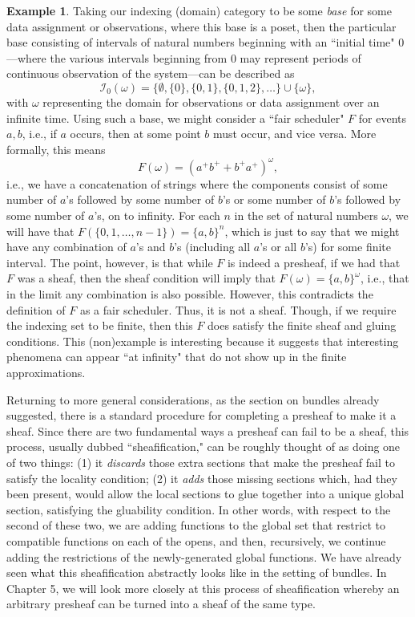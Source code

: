\documentclass[a4paper]{book}
\theoremstyle{definition}
\newtheorem{example}{Example}[section]
\theoremstyle{definition}
\theoremstyle{definition}
\theoremstyle{theorem}
\theoremstyle{definition}
\begin{document}
\begin{example}
Taking our indexing (domain) category to be some \textit{base} for some data assignment or observations, where this base is a poset, then the particular base consisting of intervals of natural numbers beginning with an ``initial time" 0---where the various intervals beginning from 0 may represent periods of continuous observation of the system---can be described as
\begin{equation*}
\mathscr{I}_0 (\omega) = \{\emptyset, \{0\}, \{0,1\}, \{0,1,2\}, \dots \} \cup \{\omega \},
\end{equation*} 
with $\omega$ representing the domain for observations or data assignment over an infinite time. Using such a base, we might consider a ``fair scheduler" $F$ for events $a,b$, i.e., if $a$ occurs, then at some point $b$ must occur, and vice versa. More formally, this means 
\begin{equation*}
F(\omega) = (a^{+}b^{+} + b^{+}a^{+})^{\omega},
\end{equation*}
 i.e., we have a concatenation of strings where the components consist of some number of $a$'s followed by some number of $b$'s or some number of $b$'s followed by some number of $a$'s, on to infinity. For each $n$ in the set of natural numbers $\omega$, we will have that $F(\{0,1,\dots,n-1 \}) = \{a, b\}^n$, which is just to say that we might have any combination of $a$'s and $b$'s (including all $a$'s or all $b$'s) for some finite interval. The point, however, is that while $F$ is indeed a presheaf, if we had that $F$ was a sheaf, then the sheaf condition will imply that $F(\omega) = \{a,b \}^{\omega}$, i.e., that in the limit any combination is also possible.  However, this contradicts the definition of $F$ as a fair scheduler. Thus, it is not a sheaf. Though, if we require the indexing set to be finite, then this $F$ does satisfy the finite sheaf and gluing conditions. This (non)example is interesting because it suggests that interesting phenomena can appear ``at infinity" that do not show up in the finite approximations. 
\end{example} 
Returning to more general considerations, as the section on bundles already suggested, there is a standard procedure for completing a presheaf to make it a sheaf. Since there are two fundamental ways a presheaf can fail to be a sheaf, this process, usually dubbed ``sheafification," can be roughly thought of as doing one of two things: (1) it \textit{discards} those extra sections that make the presheaf fail to satisfy the locality condition; (2) it \textit{adds} those missing sections which, had they been present, would allow the local sections to glue together into a unique global section, satisfying the gluability condition.  In other words, with respect to the second of these two, we are adding functions to the global set that restrict to compatible functions on each of the opens, and then, recursively, we continue adding the restrictions of the newly-generated global functions. We have already seen what this sheafification abstractly looks like in the setting of bundles. In Chapter 5, we will look more closely at this process of sheafification whereby an arbitrary presheaf can be turned into a sheaf of the same type. \par 
\end{document}

